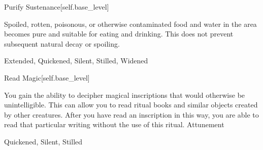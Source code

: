 \begin{spellsection}{Purify Sustenance}[self.base_level]
\begin{spellcontent}
\begin{spelltargetinginfo}
\end{spelltargetinginfo}
\begin{spelleffects}
\spelleffect
Spoiled, rotten, poisonous, or otherwise contaminated food and water in the area becomes pure and suitable for eating and drinking.
This does not prevent subsequent natural decay or spoiling.
\end{spelleffects}
\end{spellcontent}
\begin{spellfooter}
 Extended, Quickened, Silent, Stilled, Widened
\end{spellfooter}
\begin{spellsubcontent}
\end{spellsubcontent}
\end{spellsection}
\begin{spellsection}{Read Magic}[self.base_level]
\begin{spellcontent}
\begin{spelltargetinginfo}
\end{spelltargetinginfo}
\begin{spelleffects}
\spelleffect
You gain the ability to decipher magical inscriptions that would otherwise be unintelligible.
This can allow you to read ritual books and similar objects created by other creatures.
After you have read an inscription in this way, you are able to read that particular writing without the use of this ritual.
\spelldur Attunement
\end{spelleffects}
\end{spellcontent}
\begin{spellfooter}
 Quickened, Silent, Stilled
\end{spellfooter}
\begin{spellsubcontent}
\end{spellsubcontent}
\end{spellsection}
